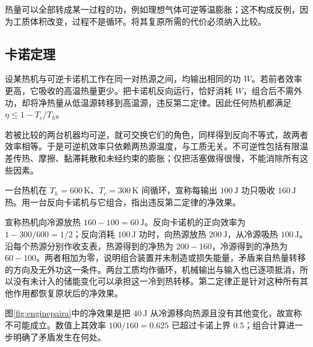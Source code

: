 热量可以全部转成某一过程的功，例如理想气体可逆等温膨胀；这不构成反例，因为工质体积改变，过程不是循环。将其复原所需的代价必须纳入比较。

\subsection{卡诺定理}
\label{th:carnottheorem}
设某热机与可逆卡诺机工作在同一对热源之间，均输出相同的功 $W$。若前者效率更高，它吸收的高温热量更少。把卡诺机反向运行，恰好消耗 $W$，组合后不需外功，却将净热量从低温源转移到高温源，违反第二定律。因此任何热机都满足 $\eta\le1-T_c/T_h$。

若被比较的两台机器均可逆，就可交换它们的角色，同样得到反向不等式，故两者效率相等。于是可逆机效率只依赖两热源温度，与工质无关。不可逆性包括有限温差传热、摩擦、黏滞耗散和未经约束的膨胀；仅把活塞做得很慢，不能消除所有这些因素。

\begin{example}[用装置组合检验宣称的效率]\label{ex:enginepair}
一台热机在 $T_h=600\,\mathrm K$、$T_c=300\,\mathrm K$ 间循环，宣称每输出 $100\,\mathrm J$ 功只吸收 $160\,\mathrm J$ 热。用一台反向卡诺机与它组合，指出违反第二定律的净效果。
\end{example}
\begin{solution}
宣称热机向冷源放热 $160-100=60\,\mathrm J$。反向卡诺机的正向效率为 $1-300/600=1/2$；反向消耗 $100\,\mathrm J$ 功时，向热源放热 $200\,\mathrm J$，从冷源吸热 $100\,\mathrm J$。
沿每个热源分别作收支表，热源得到的净热为 $200-160$，冷源得到的净热为 $60-100$。两者相加为零，说明组合装置并未制造或损失能量，矛盾来自热量转移的方向及无外功这一条件。两台工质均作循环，机械输出与输入也已逐项抵消，所以没有未计入的储能变化可以承担这一冷到热转移。第二定律正是针对这种所有其他作用都恢复原状后的净效果。

图\ref{fig:enginepaira}中的净效果是把 $40\,\mathrm J$ 从冷源移向热源且没有其他变化，故宣称不可能成立。数值上其效率 $100/160=0.625$ 已超过卡诺上界 $0.5$；组合计算进一步明确了矛盾发生在何处。
\end{solution}

